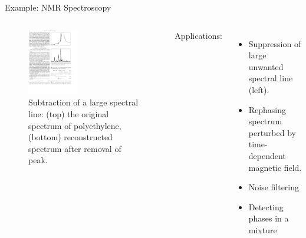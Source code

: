 \documentclass[aspectratio=169]{beamer}
\begin{document}
\begin{frame}{Example: NMR Spectroscopy}
\begin{columns}
\begin{figure}
    \centering
    \includegraphics[width=0.45\textwidth]{figures/nmrwavelet.pdf}
    \caption{Subtraction of a large spectral line: (top) the original spectrum of polyethylene, (bottom) reconstructed spectrum after removal of  peak.\cite{baracheContinuousWaveletTransform1997}}
\end{figure}
    Applications:
    \begin{itemize}
        \item Suppression of large unwanted spectral line (left).
        \item Rephasing spectrum perturbed by time-dependent magnetic field.
        \item Noise filtering
        \item Detecting phases in a mixture
    \end{itemize}
\end{columns}
\end{frame} 
\end{document}
